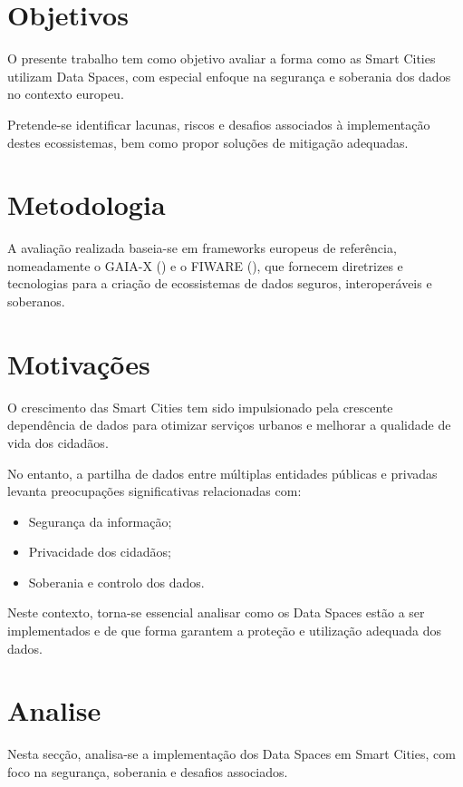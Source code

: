 \documentclass[a4paper]{article}
\begin{document}
\newpage
\section{Objetivos}\label{objetivos}
O presente trabalho tem como objetivo avaliar a forma como as Smart Cities utilizam Data Spaces, com especial enfoque na segurança e soberania dos dados no contexto europeu.

Pretende-se identificar lacunas, riscos e desafios associados à implementação destes ecossistemas, bem como propor soluções de mitigação adequadas.

\section{Metodologia}\label{metodologia}
A avaliação realizada baseia-se em frameworks europeus de referência, nomeadamente o GAIA-X (\cite{gaiax}) e o FIWARE (\cite{fiware}), que fornecem diretrizes e tecnologias para a criação de ecossistemas de dados seguros, interoperáveis e soberanos.

\section{Motivações}\label{motivacoes}
O crescimento das Smart Cities tem sido impulsionado pela crescente dependência de dados para otimizar serviços urbanos e melhorar a qualidade de vida dos cidadãos.

No entanto, a partilha de dados entre múltiplas entidades públicas e privadas levanta preocupações significativas relacionadas com:
\begin{itemize}
    \item Segurança da informação;
    \item Privacidade dos cidadãos;
    \item Soberania e controlo dos dados.
\end{itemize}

Neste contexto, torna-se essencial analisar como os Data Spaces estão a ser implementados e de que forma garantem a proteção e utilização adequada dos dados.

\newpage
\section{Analise}\label{analise}
Nesta secção, analisa-se a implementação dos Data Spaces em Smart Cities, com foco na segurança, soberania e desafios associados.
\end{document}
